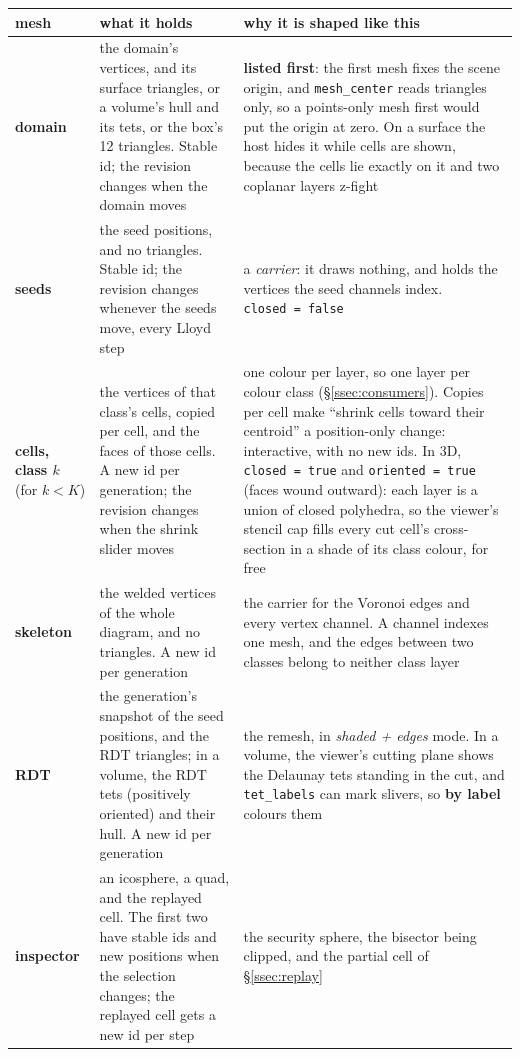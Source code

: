\documentclass[11pt,a4paper]{article}
\newcommand{\code}[1]{\texttt{#1}}          %
\newcommand{\secref}[1]{\S\ref{#1}}
\begin{document}
{\small
\begin{xltabular}{\linewidth}{@{}P{2.2cm} L L@{}}
\toprule
mesh & what it holds & why it is shaped like this \\
\midrule
\endhead
\textbf{domain}
  & the domain's vertices, and its surface triangles, or a volume's hull and its tets, or the
    box's 12 triangles. Stable id; the revision changes when the domain moves
  & \textbf{listed first}: the first mesh fixes the scene origin, and \code{mesh\_center} reads
    triangles only, so a points-only mesh first would put the origin at zero. On a surface the
    host hides it while cells are shown, because the cells lie exactly on it and two coplanar
    layers z-fight \\
\textbf{seeds}
  & the seed positions, and no triangles. Stable id; the revision changes whenever the seeds
    move, every Lloyd step
  & a \emph{carrier}: it draws nothing, and holds the vertices the seed channels index.
    \code{closed~=~false} \\
\textbf{cells, class $k$} (for $k < K$)
  & the vertices of that class's cells, copied per cell, and the faces of those cells. A new id
    per generation; the revision changes when the shrink slider moves
  & one colour per layer, so one layer per colour class (\secref{ssec:consumers}). Copies per
    cell make ``shrink cells toward their centroid'' a position-only change: interactive, with no
    new ids. In 3D, \code{closed~=~true} and \code{oriented~=~true} (faces wound outward): each
    layer is a union of closed polyhedra, so the viewer's stencil cap fills every cut cell's
    cross-section in a shade of its class colour, for free \\
\textbf{skeleton}
  & the welded vertices of the whole diagram, and no triangles. A new id per generation
  & the carrier for the Voronoi edges and every vertex channel. A channel indexes one mesh, and
    the edges between two classes belong to neither class layer \\
\textbf{RDT}
  & the generation's snapshot of the seed positions, and the RDT triangles; in a volume, the RDT
    tets (positively oriented) and their hull. A new id per generation
  & the remesh, in \emph{shaded + edges} mode. In a volume, the viewer's cutting plane shows the
    Delaunay tets standing in the cut, and \code{tet\_labels} can mark slivers, so
    \textbf{by label} colours them \\
\textbf{inspector}
  & an icosphere, a quad, and the replayed cell. The first two have stable ids and new positions
    when the selection changes; the replayed cell gets a new id per step
  & the security sphere, the bisector being clipped, and the partial cell of
    \secref{ssec:replay} \\
\bottomrule
\end{xltabular}}
\end{document}

